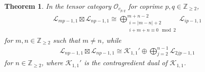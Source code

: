 \documentclass[pdftex]{sigma}
\numberwithin{equation}{section}
\newtheorem{Theorem}{Theorem}[section]
\theoremstyle{definition}
\begin{document}
\begin{Theorem}\label{thm:Vir-fus-rules}
In the tensor category $\mathcal{O}_{c_{p,q}}$ for coprime $p,q\in\mathbb{Z}_{\geq 2}$,
\begin{gather*}
\mathcal{L}_{mp-1,1}\boxtimes\mathcal{L}_{np-1,1}\cong\bigoplus_{\substack{i=\vert m-n\vert +2\\
i+m+n\equiv 0 \mod 2}}^{m+n-2} \mathcal{L}_{ip-1,1}
\end{gather*}
for $m,n\in\mathbb{Z}_{\geq 2}$ such that $m\neq n$, while
\begin{gather*}
\mathcal{L}_{np-1,1}\boxtimes\mathcal{L}_{np-1,1}\cong\mathcal{K}_{1,1}'\oplus\bigoplus_{j=2}^{n-1} \mathcal{L}_{2jp-1,1}
\end{gather*}
for $n\in\mathbb{Z}_{\geq 2}$, where $\mathcal{K}_{1,1}'$ is the contragredient dual of $\mathcal{K}_{1,1}$.
\end{Theorem}
\end{document}
